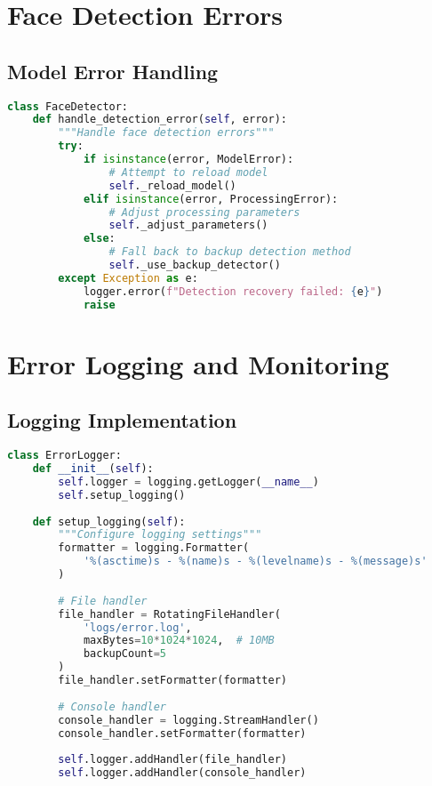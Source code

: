 \section{Face Detection Errors}

\subsection{Model Error Handling}
\begin{lstlisting}[language=Python]
class FaceDetector:
    def handle_detection_error(self, error):
        """Handle face detection errors"""
        try:
            if isinstance(error, ModelError):
                # Attempt to reload model
                self._reload_model()
            elif isinstance(error, ProcessingError):
                # Adjust processing parameters
                self._adjust_parameters()
            else:
                # Fall back to backup detection method
                self._use_backup_detector()
        except Exception as e:
            logger.error(f"Detection recovery failed: {e}")
            raise
\end{lstlisting}

\section{Error Logging and Monitoring}

\subsection{Logging Implementation}
\begin{lstlisting}[language=Python]
class ErrorLogger:
    def __init__(self):
        self.logger = logging.getLogger(__name__)
        self.setup_logging()
        
    def setup_logging(self):
        """Configure logging settings"""
        formatter = logging.Formatter(
            '%(asctime)s - %(name)s - %(levelname)s - %(message)s'
        )
        
        # File handler
        file_handler = RotatingFileHandler(
            'logs/error.log',
            maxBytes=10*1024*1024,  # 10MB
            backupCount=5
        )
        file_handler.setFormatter(formatter)
        
        # Console handler
        console_handler = logging.StreamHandler()
        console_handler.setFormatter(formatter)
        
        self.logger.addHandler(file_handler)
        self.logger.addHandler(console_handler)
\end{lstlisting}

